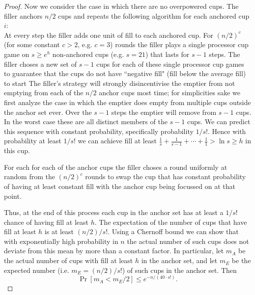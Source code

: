\documentclass{article}[11pt]
\begin{document}
\begin{proof}
  Now we consider the case in which there are no overpowered cups.
  The filler anchors $n/2$ cups and repeats the following algorithm for each
  anchored cup $i$: \\At every step the filler adds one unit of fill to each
  anchored cup. For $(n/2)^c$ (for some constant $c > 2$, e.g. $c=3$) rounds the filler plays a
  single processor cup game on $s\ge e^h$ non-anchored cups (e.g. $s=21$) that lasts for $s-1$ steps.
  The filler choses a new set of $s-1$ cups for each of these single processor
  cup games to guarantee that the cups do not have ``negative fill" (fill below
  the average fill) to start The filler's strategy will strongly disincentivise
  the emptier from not emptying from each of the $n/2$ anchor cups most time;
  for simplicities sake we first analyze the case in which the emptier does
  empty from multiple cups outside the anchor set ever. Over the $s-1$ steps the
  emptier will remove from $s-1$ cups. In the worst case these are all distinct
  members of the $s-1$ cups. We can predict this sequence with constant
  probability, specifically probability $1/s!$. Hence with probability at
  least $1/s!$ we can achieve fill at least $\frac{1}{s} + \frac{1}{s-1} +
  \cdots + \frac{1}{1} > \ln s \ge h$ in this cup.

  For each for each of the anchor cups the filler choses a round uniformly at
  random from the $(n/2)^c$ rounds to swap the cup that has constant probability of
  having at least constant fill with the anchor cup being focussed on at that point.

  Thus, at the end of this process each cup in the anchor set has at
  least a $1/s!$ chance of having fill at least $h$. The expectation of
  the number of cups that have fill at least $h$ is at least $(n/2)/s!$. 
  Using a Chernoff bound we can show that with exponentially high probability in $n$ the actual
  number of such cups does not deviate from this mean by more than a constant
  factor. In particular, let $m_A$ be the actual number of cups with fill at
  least $h$ in the anchor set, and let $m_E$ be the expected number (i.e.
  $m_E = (n/2)/s!$) of such cups in the anchor set. Then $$\Pr[m_A < m_E /2 ]
  \le e^{-n / (40\cdot s!)}.$$


\end{proof}
\end{document}
